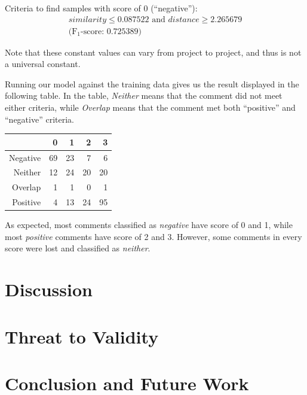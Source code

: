 \documentclass[conference]{IEEEtran}
\begin{document}
Criteria to find samples with score of 0 (``negative''):
\begin{gather*} similarity \leq 0.087522 \text{ and } distance \geq 2.265679
\\ \text{(F$_1$-score: 0.725389)}\end{gather*}

Note that these constant values can vary from project to project, and thus is not a universal constant.


Running our model against the training data gives us the result displayed in the following table.
In the table, \emph{Neither} means that the comment did not meet either criteria, while \emph{Overlap} means that the comment  met both ``positive'' and ``negative'' criteria.

\begin{center}
\begin{tabular}{|r|rrrr|}
\hline
& \bfseries 0 & \bfseries 1 & \bfseries 2 & \bfseries 3 \\
\hline
Negative & 69 & 23 & 7 & 6 \\
Neither & 12 & 24 & 20 & 20 \\
Overlap & 1 & 1 & 0 & 1 \\
Positive & 4 & 13 & 24 & 95 \\
\hline
\end{tabular}
\end{center}

As expected, most comments classified as \emph{negative} have score of 0 and 1,
while most \emph{positive} comments have score of 2 and 3.
However, some comments in every score were lost and classified as \emph{neither}.








\section{Discussion}







\section{Threat to Validity}


\section{Conclusion and Future Work}


\IEEEpeerreviewmaketitle







\end{document}
